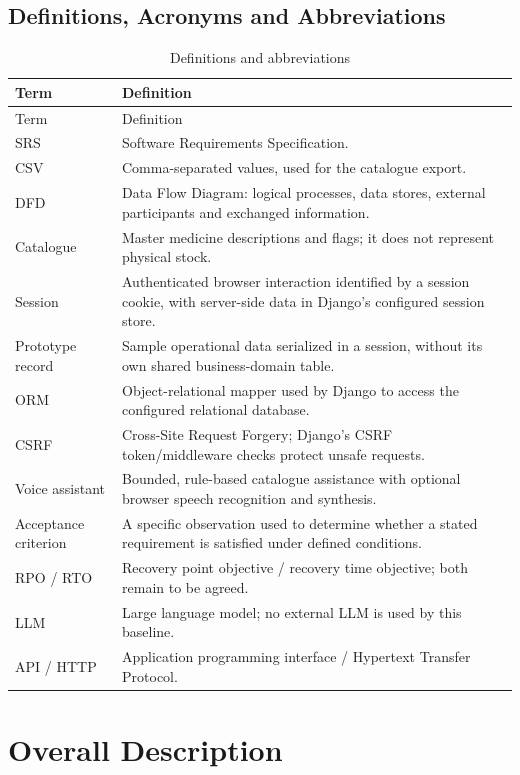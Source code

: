 \documentclass{article}
\begin{document}
\subsection{Definitions, Acronyms and Abbreviations}\label{sec:terms}
\begin{longtable}{@{}L{32mm}L{124mm}@{}}
\caption{Definitions and abbreviations}\\
\toprule Term & Definition\\\midrule\endfirsthead
\toprule Term & Definition\\\midrule\endhead
\bottomrule\endfoot
SRS & Software Requirements Specification.\\
CSV & Comma-separated values, used for the catalogue export.\\
DFD & Data Flow Diagram: logical processes, data stores, external participants and exchanged information.\\
Catalogue & Master medicine descriptions and flags; it does not represent physical stock.\\
Session & Authenticated browser interaction identified by a session cookie, with server-side data in Django's configured session store.\\
Prototype record & Sample operational data serialized in a session, without its own shared business-domain table.\\
ORM & Object-relational mapper used by Django to access the configured relational database.\\
CSRF & Cross-Site Request Forgery; Django's CSRF token/middleware checks protect unsafe requests.\\
Voice assistant & Bounded, rule-based catalogue assistance with optional browser speech recognition and synthesis.\\
Acceptance criterion & A specific observation used to determine whether a stated requirement is satisfied under defined conditions.\\
RPO / RTO & Recovery point objective / recovery time objective; both remain to be agreed.\\
LLM & Large language model; no external LLM is used by this baseline.\\
API / HTTP & Application programming interface / Hypertext Transfer Protocol.\\
\end{longtable}



\clearpage
\section{Overall Description}
\end{document}
